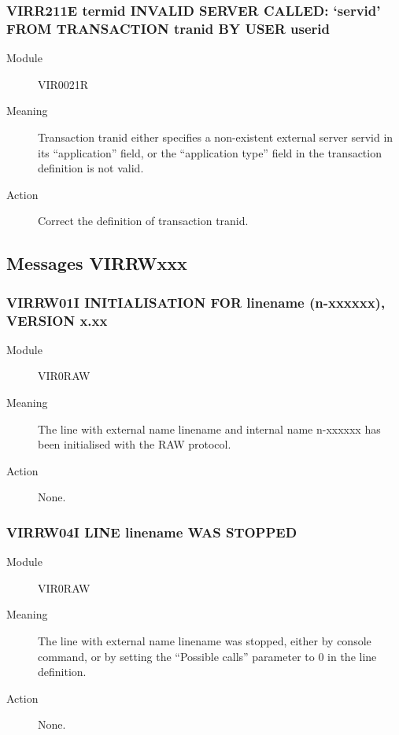 \documentclass[letterpaper,10pt,english]{sphinxmanual}
\begin{document}
\subsubsection{VIRR211E termid INVALID SERVER CALLED: ‘servid’ FROM TRANSACTION tranid BY USER userid}
\label{\detokenize{messages:virr211e-termid-invalid-server-called-servid-from-transaction-tranid-by-user-userid}}\begin{description}
\item[{Module}] \leavevmode
VIR0021R

\item[{Meaning}] \leavevmode
Transaction tranid either specifies a non-existent external server servid in its “application” field, or the “application type” field in the transaction definition is not valid.

\item[{Action}] \leavevmode
Correct the definition of transaction tranid.

\end{description}


\subsection{Messages VIRRWxxx}
\label{\detokenize{messages:messages-virrwxxx}}

\subsubsection{VIRRW01I INITIALISATION FOR linename (n-xxxxxx), VERSION x.xx}
\label{\detokenize{messages:virrw01i-initialisation-for-linename-n-xxxxxx-version-x-xx}}\begin{description}
\item[{Module}] \leavevmode
VIR0RAW

\item[{Meaning}] \leavevmode
The line with external name linename and internal name n-xxxxxx has been initialised with the RAW protocol.

\item[{Action}] \leavevmode
None.

\end{description}


\subsubsection{VIRRW04I LINE linename WAS STOPPED}
\label{\detokenize{messages:virrw04i-line-linename-was-stopped}}\begin{description}
\item[{Module}] \leavevmode
VIR0RAW

\item[{Meaning}] \leavevmode
The line with external name linename was stopped, either by console command, or by setting the “Possible calls” parameter to 0 in the line definition.

\item[{Action}] \leavevmode
None.

\end{description}
\end{document}
